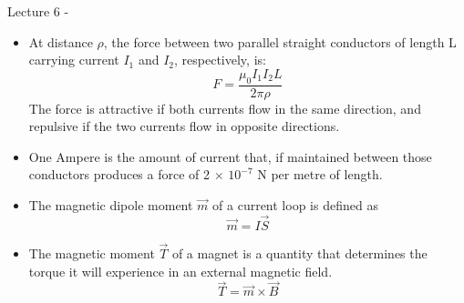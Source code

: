 
\renewcommand{\summarizedlecture}{6 }


\begin{frame}{Lecture \summarizedlecture - \lecturesummarytitle}

\begin{itemize}

\item
  At distance $\rho$, the force between two parallel straight
  conductors of length L carrying current $I_1$ and $I_2$,
  respectively, is:
  \begin{equation*}
    F = \frac{\mu_0 I_{1} I_{2} L}{2\pi \rho}
  \end{equation*}
  The force is attractive if both currents flow in the same direction, and
  repulsive if the two currents flow in opposite directions.

\item
  One Ampere is the amount of current that,
  if maintained between those conductors produces a force of 2
  $\times$ $10^{-7}$ N per metre of length.

\item
  The magnetic dipole moment $\vec{m}$ of a current loop is defined as
  \begin{equation*}
      \vec{m} = I \vec{S}
   \end{equation*}

\item
  The magnetic moment $\vec{T}$ of a magnet is a quantity that
  determines the torque it will experience in an external magnetic field.
  \begin{equation*}
      \vec{T} = \vec{m} \times \vec{B}
  \end{equation*}

\end{itemize}

\end{frame}

%
%
%

